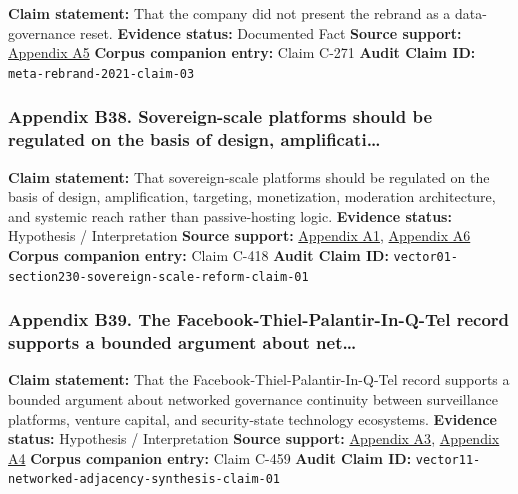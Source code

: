 \documentclass[
  american,
  11pt,
  letterpaper,
]{article}
\begin{document}
\textbf{Claim statement:} That the company did not present the rebrand
as a data-governance reset. \textbf{Evidence status:} Documented Fact
\textbf{Source support:}
\hyperref[ch-01-appendix-a5-the-facebook-company-is-now-meta]{Appendix
A5} \textbf{Corpus companion entry:} Claim C-271 \textbf{Audit Claim
ID:} \texttt{meta-rebrand-2021-claim-03}

\subsubsection{Appendix B38. Sovereign-scale platforms should be
regulated on the basis of design,
amplificati\ldots{}}\label{ch-01-appendix-b38-sovereign-scale-platforms-should-be-regulated-on-the-basis-of-design-amplificati}

\textbf{Claim statement:} That sovereign-scale platforms should be
regulated on the basis of design, amplification, targeting,
monetization, moderation architecture, and systemic reach rather than
passive-hosting logic. \textbf{Evidence status:} Hypothesis /
Interpretation \textbf{Source support:}
\hyperref[ch-01-appendix-a1-a-look-behind-the-screens-examining-the-data-practices-of-social-media-and-video-streaming-services]{Appendix
A1},
\hyperref[ch-01-appendix-a6-meta-platforms-inc-2023-annual-report-form-10-k]{Appendix
A6} \textbf{Corpus companion entry:} Claim C-418 \textbf{Audit Claim
ID:} \texttt{vector01-section230-sovereign-scale-reform-claim-01}

\subsubsection{Appendix B39. The Facebook-Thiel-Palantir-In-Q-Tel record
supports a bounded argument about
net\ldots{}}\label{ch-01-appendix-b39-the-facebook-thiel-palantir-in-q-tel-record-supports-a-bounded-argument-about-net}

\textbf{Claim statement:} That the Facebook-Thiel-Palantir-In-Q-Tel
record supports a bounded argument about networked governance continuity
between surveillance platforms, venture capital, and security-state
technology ecosystems. \textbf{Evidence status:} Hypothesis /
Interpretation \textbf{Source support:}
\hyperref[ch-01-appendix-a3-facebook-inc-registration-statement-on-form-s-1]{Appendix
A3},
\hyperref[ch-01-appendix-a4-meta-platforms-inc-2022-definitive-proxy-statement]{Appendix
A4} \textbf{Corpus companion entry:} Claim C-459 \textbf{Audit Claim
ID:} \texttt{vector11-networked-adjacency-synthesis-claim-01}
\end{document}
